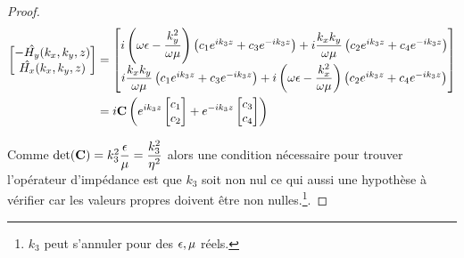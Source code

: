 \begin{proof}
        \begin{align}
            \begin{bmatrix}
                -\hat{H_y}(k_x,k_y,z)\\
                \hat{H_x}(k_x,k_y,z)\\
            \end{bmatrix}
            &=
            \begin{bmatrix}
                i\left(\omega\epsilon - \dfrac{k_y^2}{\omega\mu}\right) \left( c_1 e^{ik_3 z} + c_3 e^{-ik_3 z} \right) + i\dfrac{k_xk_y}{\omega\mu} \left( c_2 e^{ik_3 z} + c_4 e^{-ik_3 z} \right)
                \\
                i\dfrac{k_xk_y}{\omega\mu} \left( c_1 e^{ik_3 z} + c_3 e^{-ik_3 z} \right) + i\left(\omega\epsilon - \dfrac{k_x^2}{\omega\mu}\right)\left( c_2 e^{ik_3 z} + c_4 e^{-ik_3 z} \right)
            \end{bmatrix} \\
            &=i
            \mathbf{C}
            \left(
                e^{ik_3 z}
                \begin{bmatrix}
                    c_1 \\
                    c_2
                \end{bmatrix}
                +e^{-ik_3 z}
                \begin{bmatrix}
                    c_3 \\
                    c_4
                \end{bmatrix}
            \right)
        \end{align}

        Comme \(\det(\mathbf{C}) = k_3^2\dfrac{\epsilon}{\mu}=\dfrac{k_3^2}{\eta^2}\) alors une condition nécessaire pour trouver l'opérateur d'impédance est que \(k_3\) soit non nul ce qui aussi une hypothèse à vérifier car les valeurs propres doivent être non nulles.\footnote{\(k_3\) peut s'annuler pour des \(\epsilon,\mu\) réels.}.

    \end{proof}





